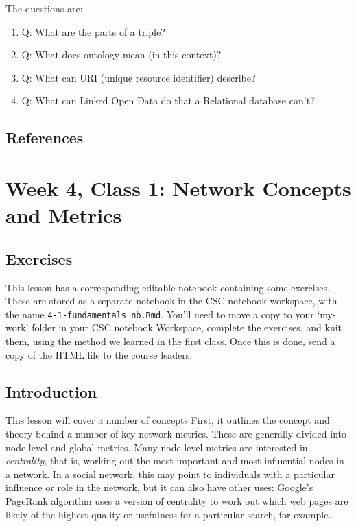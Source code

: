 \documentclass[
]{book}
\providecommand{\tightlist}{%
  \setlength{\itemsep}{0pt}\setlength{\parskip}{0pt}}
\begin{document}
The questions are:

\begin{enumerate}
\def\labelenumi{\arabic{enumi})}
\tightlist
\item
  Q: What are the parts of a triple?
\item
  Q: What does ontology mean (in this context)?
\item
  Q: What can URI (unique resource identifier) describe?
\item
  Q: What can Linked Open Data do that a Relational database can't?
\end{enumerate}

\hypertarget{references-3}{%
\section{References}\label{references-3}}

\hypertarget{week-4-class-1-network-concepts-and-metrics}{%
\chapter{Week 4, Class 1: Network Concepts and Metrics}\label{week-4-class-1-network-concepts-and-metrics}}

\hypertarget{exercises-1}{%
\section{Exercises}\label{exercises-1}}

This lesson has a corresponding editable notebook containing some exercises. These are stored as a separate notebook in the CSC notebook workspace, with the name \texttt{4-1-fundamentals\_nb.Rmd}. You'll need to move a copy to your `my-work' folder in your CSC notebook Workspace, complete the exercises, and knit them, using the \href{https://comhis.github.io/applying-network-analysis-to-humanities/notebooks/1-1-introduction_nb.html}{method we learned in the first class}. Once this is done, send a copy of the HTML file to the course leaders.

\hypertarget{introduction-2}{%
\section{Introduction}\label{introduction-2}}

This lesson will cover a number of concepts First, it outlines the concept and theory behind a number of key network metrics. These are generally divided into node-level and global metrics. Many node-level metrics are interested in \emph{centrality}, that is, working out the most important and most influential nodes in a network. In a social network, this may point to individuals with a particular influence or role in the network, but it can also have other uses: Google's PageRank algorithm uses a version of centrality to work out which web pages are likely of the highest quality or usefulness for a particular search, for example.
\end{document}
